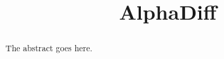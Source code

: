 \documentclass[10pt,conference]{IEEEtran}
\begin{document}
%
\title{AlphaDiff}




% 


\maketitle

\begin{abstract}
The abstract goes here.
\end{abstract}
\end{document}
